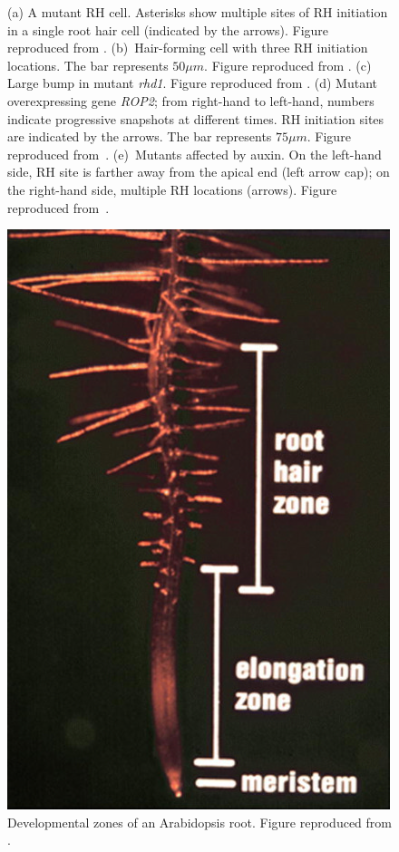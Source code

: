 \begin{figure}[t!]
\caption[Hair-forming mutant cells.]{(a) A mutant RH cell. Asterisks show multiple sites of RH initiation in a single root hair cell (indicated by the arrows). Figure reproduced from \cite{rigas01}. (b)~Hair-forming cell with three RH initiation locations. The bar represents $50\mu m$. Figure reproduced from \cite{massuci01}. (c) Large bump in mutant {\itshape rhd1}. Figure reproduced from \cite{griersonRH}. (d) Mutant overexpressing gene {\itshape ROP2}; from right-hand to left-hand, numbers indicate progressive snapshots at different times. RH initiation sites are indicated by the arrows. The bar represents $75\mu m$. Figure reproduced from~\cite{mjones01}. (e)~Mutants affected by auxin. On the left-hand side, RH site is farther away from the apical end (left arrow cap); on the right-hand side, multiple RH locations (arrows). Figure reproduced from~\cite{payne01}.}
\label{fig:multiRH02_alt}
\end{figure}

\begin{figure}[t!]
	\centering
	\includegraphics[height=0.35\textheight]{fig01/devepzones}
	\caption[Developmental zones of an Arabidopsis root.]{Developmental zones of an Arabidopsis root. Figure reproduced from \cite{griersonRH}.}
	\label{fig:RHP02}
\end{figure}

